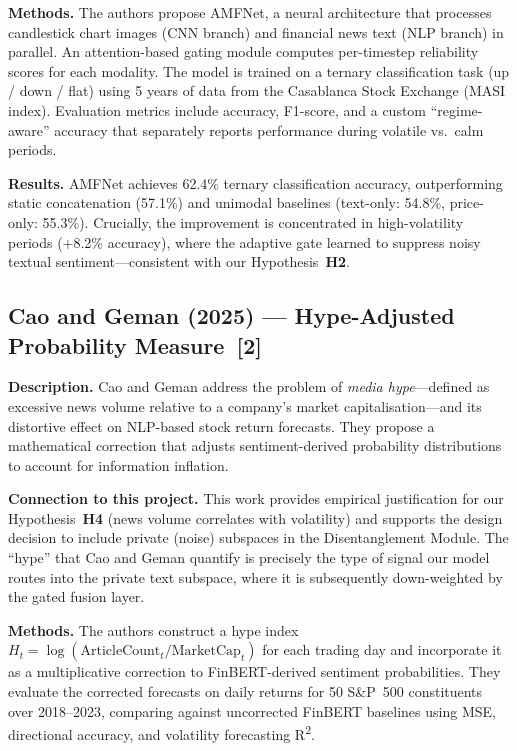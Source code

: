 \documentclass[12pt, a4paper]{article}
\begin{document}
\textbf{Methods.}
The authors propose AMFNet, a neural architecture that processes candlestick chart images (CNN branch) and financial news text (NLP branch) in parallel. An attention-based gating module computes per-timestep reliability scores for each modality. The model is trained on a ternary classification task (up / down / flat) using 5 years of data from the Casablanca Stock Exchange (MASI index). Evaluation metrics include accuracy, F1-score, and a custom ``regime-aware'' accuracy that separately reports performance during volatile vs.\ calm periods.

\textbf{Results.}
AMFNet achieves 62.4\% ternary classification accuracy, outperforming static concatenation (57.1\%) and unimodal baselines (text-only: 54.8\%, price-only: 55.3\%). Crucially, the improvement is concentrated in high-volatility periods (+8.2\% accuracy), where the adaptive gate learned to suppress noisy textual sentiment---consistent with our Hypothesis~\textbf{H2}.


\subsection{Cao and Geman (2025) --- Hype-Adjusted Probability Measure~[2]}

\textbf{Description.}
Cao and Geman address the problem of \textit{media hype}---defined as excessive news volume relative to a company's market capitalisation---and its distortive effect on NLP-based stock return forecasts. They propose a mathematical correction that adjusts sentiment-derived probability distributions to account for information inflation.

\textbf{Connection to this project.}
This work provides empirical justification for our Hypothesis~\textbf{H4} (news volume correlates with volatility) and supports the design decision to include private (noise) subspaces in the Disentanglement Module. The ``hype'' that Cao and Geman quantify is precisely the type of signal our model routes into the private text subspace, where it is subsequently down-weighted by the gated fusion layer.

\textbf{Methods.}
The authors construct a hype index $H_t = \log(\text{ArticleCount}_t / \text{MarketCap}_t)$ for each trading day and incorporate it as a multiplicative correction to FinBERT-derived sentiment probabilities. They evaluate the corrected forecasts on daily returns for 50 S\&P~500 constituents over 2018--2023, comparing against uncorrected FinBERT baselines using MSE, directional accuracy, and volatility forecasting R\textsuperscript{2}.
\end{document}
